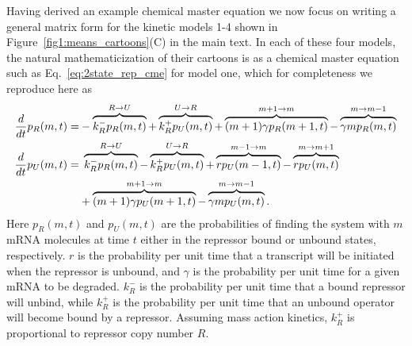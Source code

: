Having derived an example chemical master equation we now focus on writing a
general matrix form for the kinetic models 1-4 shown in
Figure~\ref{fig1:means_cartoons}(C) in the main text. In each of these four
models, the natural mathematicization of their cartoons is as a chemical master
equation such as Eq.~\ref{eq:2state_rep_cme} for model one, which for
completeness we reproduce here as
\begin{align}
\begin{split}
\frac{d {}}{d t}p_R(m,t) =& 
- \overbrace{k_R^- p_R(m,t)}^{R \rightarrow U}
+ \overbrace{k_R^+ p_U(m,t)}^{U \rightarrow R}
+ \overbrace{(m+1)\gamma p_R(m+1,t)}^{m + 1 \rightarrow m}
- \overbrace{\gamma mp_R(m,t)}^{m \rightarrow m - 1}
\\
\frac{d {}}{d t}p_U(m,t) =&\; 
\overbrace{k_R^- p_R(m,t)}^{R \rightarrow U}
- \overbrace{k_R^+ p_U(m,t)}^{U \rightarrow R}
+ \overbrace{rp_U(m-1,t)}^{m-1 \rightarrow m}
- \overbrace{rp_U(m,t)}^{m \rightarrow m + 1}
\\
&+ \overbrace{(m+1)\gamma p_U(m+1,t)}^{m + 1 \rightarrow m}
- \overbrace{\gamma mp_U(m,t)}^{m \rightarrow m - 1}.
\label{eq:poisson_promoter_cme_appdx}
\end{split}
\end{align}
Here $p_R(m,t)$ and $p_U(m,t)$ are the probabilities of finding the system with
$m$ mRNA molecules at time $t$ either in the repressor bound or unbound states,
respectively. $r$ is the probability per unit time that a transcript will be
initiated when the repressor is unbound, and $\gamma$ is the probability per
unit time for a given mRNA to be degraded. $k_R^-$ is the probability per unit
time that a bound repressor will unbind, while $k_R^+$ is the probability per
unit time that an unbound operator will become bound by a repressor. Assuming
mass action kinetics, $k_R^+$ is proportional to repressor copy number $R$.


